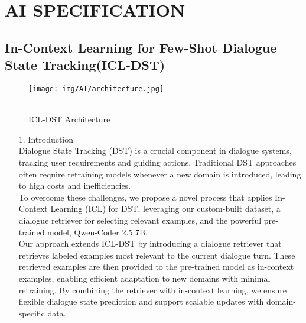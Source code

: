 \documentclass[conference]{IEEEtran}
\begin{document}
\section{AI SPECIFICATION}

\subsection{In-Context Learning for Few-Shot Dialogue State Tracking(ICL-DST)}


\begin{figure}[h]
\hspace{1.5cm}
\centering
\begin{minipage}{0.8\columnwidth}
    \texttt{[image: img/AI/architecture.jpg]}
    \caption{\\     ICL-DST Architecture }
\end{minipage}
\end{figure}

\begin{itemize}
    \item [1.] Introduction \\
    Dialogue State Tracking (DST) is a crucial component in dialogue systems, tracking user requirements and guiding actions. Traditional DST approaches often require retraining models whenever a new domain is introduced, leading to high costs and inefficiencies. \\ 
    To overcome these challenges, we propose a novel process that applies In-Context Learning (ICL) for DST, leveraging our custom-built dataset, a dialogue retriever for selecting relevant examples, and the powerful pre-trained model, Qwen-Coder 2.5 7B. \\
    \hspace{1cm} Our approach extends ICL-DST by introducing a dialogue retriever that retrieves labeled examples most relevant to the current dialogue turn. These retrieved examples are then provided to the pre-trained model as in-context examples, enabling efficient adaptation to new domains with minimal retraining. By combining the retriever with in-context learning, we ensure flexible dialogue state prediction and support scalable updates with domain-specific data. \\
\end{itemize}
\end{document}
